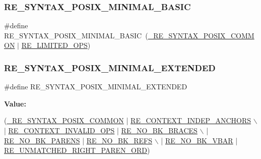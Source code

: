 \subsubsection{\texorpdfstring{R\+E\+\_\+\+S\+Y\+N\+T\+A\+X\+\_\+\+P\+O\+S\+I\+X\+\_\+\+M\+I\+N\+I\+M\+A\+L\+\_\+\+B\+A\+S\+IC}{RE\_SYNTAX\_POSIX\_MINIMAL\_BASIC}}
{\footnotesize\ttfamily \#define R\+E\+\_\+\+S\+Y\+N\+T\+A\+X\+\_\+\+P\+O\+S\+I\+X\+\_\+\+M\+I\+N\+I\+M\+A\+L\+\_\+\+B\+A\+S\+IC~(\hyperlink{a00092_a7ff4656f125a3d46461419e33451db1b}{\+\_\+\+R\+E\+\_\+\+S\+Y\+N\+T\+A\+X\+\_\+\+P\+O\+S\+I\+X\+\_\+\+C\+O\+M\+M\+ON} $\vert$ \hyperlink{a00092_a0782bb31ad7160085c33f13dca7e369f}{R\+E\+\_\+\+L\+I\+M\+I\+T\+E\+D\+\_\+\+O\+PS})}

\mbox{\label{a00092_a50494cb5289215dc5bfcf4d4cec347c6}} 
\subsubsection{\texorpdfstring{R\+E\+\_\+\+S\+Y\+N\+T\+A\+X\+\_\+\+P\+O\+S\+I\+X\+\_\+\+M\+I\+N\+I\+M\+A\+L\+\_\+\+E\+X\+T\+E\+N\+D\+ED}{RE\_SYNTAX\_POSIX\_MINIMAL\_EXTENDED}}
{\footnotesize\ttfamily \#define R\+E\+\_\+\+S\+Y\+N\+T\+A\+X\+\_\+\+P\+O\+S\+I\+X\+\_\+\+M\+I\+N\+I\+M\+A\+L\+\_\+\+E\+X\+T\+E\+N\+D\+ED}

{\bfseries Value\+:}
\begin{DoxyCode}
(\hyperlink{a00092_a7ff4656f125a3d46461419e33451db1b}{\_RE\_SYNTAX\_POSIX\_COMMON}  | \hyperlink{a00092_a544bf7770a00eaaa62374a00fea08a2d}{RE\_CONTEXT\_INDEP\_ANCHORS}         
      \(\backslash\)
   | \hyperlink{a00092_ae344a4e6129c8d549a88cd5f45e86adb}{RE\_CONTEXT\_INVALID\_OPS} | \hyperlink{a00092_a924b9782a779a0db37e3c858967d60af}{RE\_NO\_BK\_BRACES}              \(\backslash\)
   | \hyperlink{a00092_af2f17f18a9c771c91d963f466f559e68}{RE\_NO\_BK\_PARENS}        | \hyperlink{a00092_aed01be95fde1250190b37b7788af5f35}{RE\_NO\_BK\_REFS}             \(\backslash\)
   | \hyperlink{a00092_a834997e69569c41f0394d6ee120051a0}{RE\_NO\_BK\_VBAR}     | \hyperlink{a00092_af1907a994cab6bd73ad14677b126a64b}{RE\_UNMATCHED\_RIGHT\_PAREN\_ORD})
\end{DoxyCode}
\mbox{\label{a00092_ad83dabb8b07d518a3e2a64fa8bba3f03}} 
